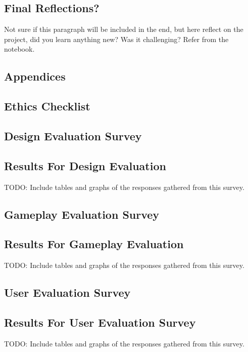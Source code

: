 \documentclass{l4proj}
\begin{document}
\section{Final Reflections?}
Not sure if this paragraph will be included in the end, but here reflect on the project, did you learn anything new? Was it challenging? Refer from the notebook.

%
% 

\begin{appendices}

\chapter{Appendices}

\section{Ethics Checklist}



\section{Design Evaluation Survey}



\section{Results For Design Evaluation}
TODO: Include tables and graphs of the responses gathered from this survey.

\section{Gameplay Evaluation Survey}



\section{Results For Gameplay Evaluation}
TODO: Include tables and graphs of the responses gathered from this survey.

\section{User Evaluation Survey}



\section{Results For User Evaluation Survey}
TODO: Include tables and graphs of the responses gathered from this survey.


\end{appendices}
\end{document}
